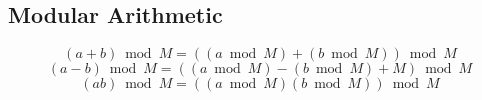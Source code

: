 \subsection{Modular Arithmetic}
\[
(a+b)\bmod M=((a\bmod M)+(b\bmod M))\bmod M
\]
\[
(a-b)\bmod M=((a\bmod M)-(b\bmod M)+M)\bmod M
\]
\[
(ab)\bmod M=((a\bmod M)(b\bmod M))\bmod M
\]
